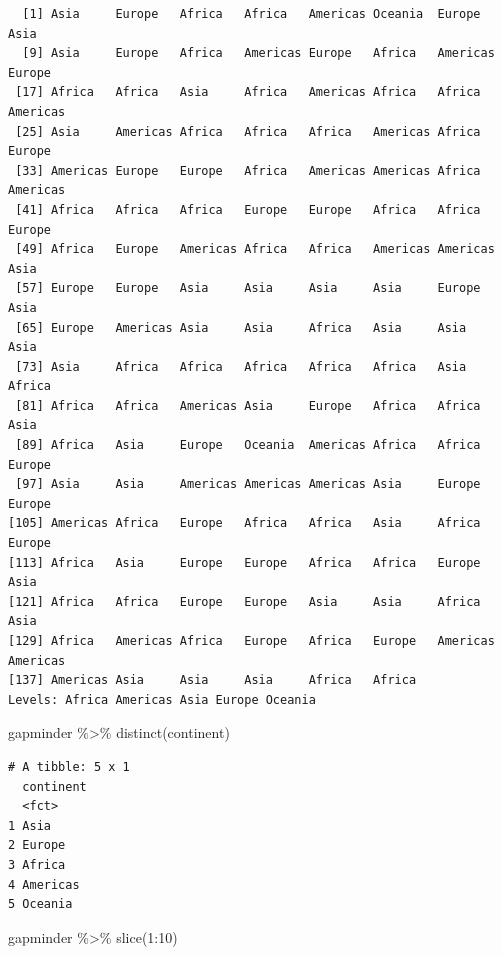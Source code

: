 \documentclass[
  portuguese,
  letterpaper,
  DIV=11,
  numbers=noendperiod]{scrreprt}
\newenvironment{Shaded}{\begin{snugshade}}{\end{snugshade}}
\newcommand{\DecValTok}[1]{\textcolor[rgb]{0.68,0.00,0.00}{#1}}
\newcommand{\FunctionTok}[1]{\textcolor[rgb]{0.28,0.35,0.67}{#1}}
\newcommand{\NormalTok}[1]{\textcolor[rgb]{0.00,0.23,0.31}{#1}}
\newcommand{\SpecialCharTok}[1]{\textcolor[rgb]{0.37,0.37,0.37}{#1}}
\theoremstyle{definition}
\theoremstyle{remark}
\begin{document}
\begin{verbatim}
  [1] Asia     Europe   Africa   Africa   Americas Oceania  Europe   Asia    
  [9] Asia     Europe   Africa   Americas Europe   Africa   Americas Europe  
 [17] Africa   Africa   Asia     Africa   Americas Africa   Africa   Americas
 [25] Asia     Americas Africa   Africa   Africa   Americas Africa   Europe  
 [33] Americas Europe   Europe   Africa   Americas Americas Africa   Americas
 [41] Africa   Africa   Africa   Europe   Europe   Africa   Africa   Europe  
 [49] Africa   Europe   Americas Africa   Africa   Americas Americas Asia    
 [57] Europe   Europe   Asia     Asia     Asia     Asia     Europe   Asia    
 [65] Europe   Americas Asia     Asia     Africa   Asia     Asia     Asia    
 [73] Asia     Africa   Africa   Africa   Africa   Africa   Asia     Africa  
 [81] Africa   Africa   Americas Asia     Europe   Africa   Africa   Asia    
 [89] Africa   Asia     Europe   Oceania  Americas Africa   Africa   Europe  
 [97] Asia     Asia     Americas Americas Americas Asia     Europe   Europe  
[105] Americas Africa   Europe   Africa   Africa   Asia     Africa   Europe  
[113] Africa   Asia     Europe   Europe   Africa   Africa   Europe   Asia    
[121] Africa   Africa   Europe   Europe   Asia     Asia     Africa   Asia    
[129] Africa   Americas Africa   Europe   Africa   Europe   Americas Americas
[137] Americas Asia     Asia     Asia     Africa   Africa  
Levels: Africa Americas Asia Europe Oceania
\end{verbatim}

\begin{Shaded}
\begin{Highlighting}[]
\NormalTok{gapminder }\SpecialCharTok{\%\textgreater{}\%} 
  \FunctionTok{distinct}\NormalTok{(continent)}
\end{Highlighting}
\end{Shaded}

\begin{verbatim}
# A tibble: 5 x 1
  continent
  <fct>    
1 Asia     
2 Europe   
3 Africa   
4 Americas 
5 Oceania  
\end{verbatim}

\begin{Shaded}
\begin{Highlighting}[]
\NormalTok{gapminder }\SpecialCharTok{\%\textgreater{}\%} 
  \FunctionTok{slice}\NormalTok{(}\DecValTok{1}\SpecialCharTok{:}\DecValTok{10}\NormalTok{)}
\end{Highlighting}
\end{Shaded}
\end{document}
